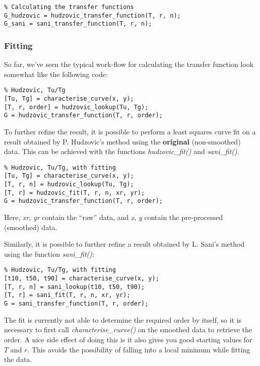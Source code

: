 \begin{lstlisting}
% Calculating the transfer functions
G_hudzovic = hudzovic_transfer_function(T, r, n);
G_sani = sani_transfer_function(T, r, n);
\end{lstlisting}


\subsubsection*{Fitting}

So far, we've seen the  typical  work-flow for calculating the transfer function
look somewhat like the following code:

\begin{lstlisting}
% Hudzovic, Tu/Tg
[Tu, Tg] = characterise_curve(x, y);
[T, r, order] = hudzovic_lookup(Tu, Tg);
G = hudzovic_transfer_function(T, r, order);
\end{lstlisting}

To  further  refine  the result, it is possible to perform a least squares curve
fit on a result  obtained  by  P.  Hudzovic's method using the \textbf{original}
(non-smoothed)    data.    This    can   be   achieved   with   the    functions
\textit{hudzovic\_fit()} and \textit{sani\_fit()}.

\begin{lstlisting}
% Hudzovic, Tu/Tg, with fitting
[Tu, Tg] = characterise_curve(x, y);
[T, r, n] = hudzovic_lookup(Tu, Tg);
[T, r] = hudzovic_fit(T, r, n, xr, yr);
G = hudzovic_transfer_function(T, r, order);
\end{lstlisting}

Here,  \textit{xr},  \textit{yr}  contain  the  ``raw''  data,  and  \textit{x},
\textit{y} contain the pre-processed (smoothed) data.

Similarly, it is  possible  to  further  refine  a  result obtained by L. Sani's
method using the function \textit{sani\_fit()}:

\begin{lstlisting}
% Hudzovic, Tu/Tg, with fitting
[t10, t50, t90] = characterise_curve(x, y);
[T, r, n] = sani_lookup(t10, t50, t90);
[T, r] = sani_fit(T, r, n, xr, yr);
G = sani_transfer_function(T, r, order);
\end{lstlisting}

The fit is currently not  able  to determine the required order by itself, so it
is necessary to first call \textit{characterise\_curve()} on  the  smoothed data
to retrieve the order. A nice  side  effect  of  doing this is it also gives you
good starting values for $T$ and $r$. This  avoids  the  possibility  of falling
into a local minimum while fitting the data.

